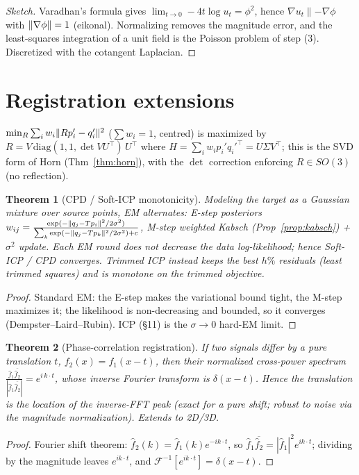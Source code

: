 \documentclass[11pt]{article}
\theoremstyle{definition}\newtheorem{definition}{Definition}[section]
\theoremstyle{plain}\newtheorem{theorem}{Theorem}[section]
\begin{document}
\begin{proof}[Sketch]
Varadhan's formula gives $\lim_{t\to0}-4t\log u_t=\phi^2$, hence $\nabla u_t\parallel-\nabla\phi$ with
$\lVert \nabla\phi\rVert=1$ (eikonal). Normalizing removes the magnitude error, and the least-squares integration of
a unit field is the Poisson problem of step (3). Discretized with the cotangent Laplacian.
\end{proof}

\section{Registration extensions}
\begin{proposition}[Weighted Kabsch = Horn]\label{prop:kabsch}
$\min_R\sum_i w_i\lVert Rp_i'-q_i'\rVert^2$ ($\sum w_i=1$, centred) is maximized by $R=V\,\mathrm{diag}(1,1,\det
VU^\top)\,U^\top$ where $H=\sum_i w_i p_i' q_i'^\top=U\Sigma V^\top$; this is the SVD form of Horn
(Thm~\ref{thm:horn}), with the $\det$ correction enforcing $R\in SO(3)$ (no reflection).
\end{proposition}
\begin{theorem}[CPD / Soft-ICP monotonicity]\label{thm:cpd}
Modeling the target as a Gaussian mixture over source points, EM alternates: E-step posteriors
$w_{ij}=\frac{\exp(-\lVert q_j-Tp_i\rVert^2/2\sigma^2)}{\sum_k\exp(-\lVert q_j-Tp_k\rVert^2/2\sigma^2)+c}$, M-step weighted
Kabsch (Prop~\ref{prop:kabsch}) + $\sigma^2$ update. Each EM round does not decrease the data
log-likelihood; hence Soft-ICP / CPD converges. Trimmed ICP instead keeps the best $h\%$ residuals (least
trimmed squares) and is monotone on the trimmed objective.
\end{theorem}
\begin{proof}
Standard EM: the E-step makes the variational bound tight, the M-step maximizes it; the likelihood is
non-decreasing and bounded, so it converges (Dempster--Laird--Rubin). ICP (\S11) is the $\sigma\to0$ hard-EM
limit.
\end{proof}
\begin{theorem}[Phase-correlation registration]\label{thm:phasecorr}
If two signals differ by a pure translation $t$, $f_2(x)=f_1(x-t)$, then their normalized cross-power
spectrum $\frac{\hat f_1\overline{\hat f_2}}{|\hat f_1\overline{\hat f_2}|}=e^{i\,k\cdot t}$, whose inverse
Fourier transform is $\delta(x-t)$. Hence the translation is the location of the inverse-FFT peak (exact for a
pure shift; robust to noise via the magnitude normalization). Extends to 2D/3D.
\end{theorem}
\begin{proof}
Fourier shift theorem: $\hat f_2(k)=\hat f_1(k)e^{-ik\cdot t}$, so $\hat f_1\overline{\hat f_2}=|\hat f_1|^2
e^{ik\cdot t}$; dividing by the magnitude leaves $e^{ik\cdot t}$, and $\mathcal F^{-1}[e^{ik\cdot t}]=\delta(x-t)$.
\end{proof}
\end{document}
